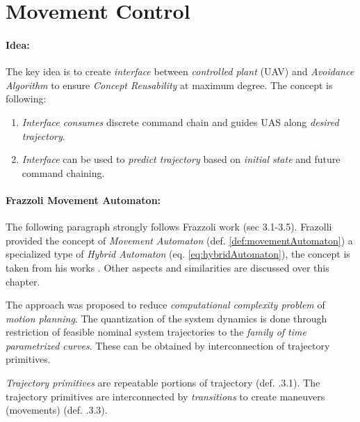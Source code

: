 \section{Movement Control}\label{s:movementAutomatonTheory}

\paragraph{Idea:} The key idea is to create \emph{interface} between \emph{controlled plant} (UAV) and \emph{Avoidance Algorithm} to ensure \emph{Concept Reusability} at maximum degree.  The concept is following:

\begin{enumerate}

    \item \emph{Interface consumes} discrete command chain and guides UAS along \emph{desired trajectory}.
    
    \item \emph{Interface} can be used to \emph{predict trajectory} based on \emph{initial state} and future command chaining. 
\end{enumerate}


\paragraph{Frazzoli Movement Automaton:} The following paragraph strongly follows Frazzoli work \cite{frazzoli2001robust} (sec 3.1-3.5). Frazolli provided the concept of \emph{Movement Automaton} (def. \ref{def:movementAutomaton}) a specialized type of \emph{Hybrid Automaton} (eq. \ref{eq:hybridAutomaton}), the concept is taken from his works \cite{frazzoli2001robust,frazzoli2000trajectory}. Other aspects and similarities are discussed over this chapter. 


The approach was proposed to reduce \emph{computational complexity problem} of \emph{motion planning}. The quantization of the system dynamics is done through restriction of feasible nominal system trajectories to the \emph{family of time parametrized curves}. These can be obtained by interconnection of trajectory primitives.

\emph{Trajectory primitives} are repeatable portions of trajectory (def. \cite{frazzoli2001robust}.3.1). The trajectory primitives are interconnected by \emph{transitions} to create maneuvers (movements) (def. \cite{frazzoli2001robust}.3.3). 

